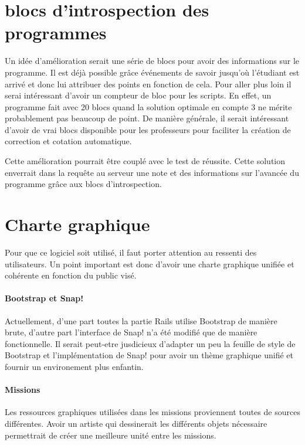 \section{blocs d'introspection des programmes}
Un idée d'amélioration serait une série de blocs pour avoir des informations sur le programme. Il est déjà possible grâce événements de savoir jusqu'où l'étudiant est arrivé et donc lui attribuer des points en fonction de cela. Pour aller plus loin il serai intéressant d'avoir un compteur de bloc pour les scripts. En effet, un programme fait avec 20 blocs quand la solution optimale en compte 3 ne mérite probablement pas beaucoup de point.
De manière générale, il serait intéressant d'avoir de vrai blocs disponible pour les professeurs pour faciliter la création de correction et cotation automatique.

Cette amélioration pourrait être couplé avec le test de réussite. Cette solution enverrait dans la requête au serveur une note et des informations sur l'avancée du programme grâce aux blocs d'introspection.

\section{Charte graphique}
Pour que ce logiciel soit utilisé, il faut porter attention au ressenti des utilisateurs. Un point important est donc d'avoir une charte graphique unifiée et cohérente en fonction du public visé.

\paragraph{Bootstrap et Snap!}
Actuellement, d'une part toutes la partie Rails utilise Bootstrap de manière brute, d'autre part l'interface de Snap! n'a été modifié que de manière fonctionnelle. Il serait peut-etre jusdicieux d'adapter un peu la feuille de style de Bootstrap et l'implémentation de Snap! pour avoir un thème graphique unifié et fournir un environement plus enfantin.

\paragraph{Missions}
Les ressources graphiques utilisées dans les missions proviennent toutes de sources différentes. Avoir un artiste qui dessinerait les différents objets nécessaire permettrait de créer une meilleure unité entre les missions.


% 
% 
% 
% 
% 
% 
